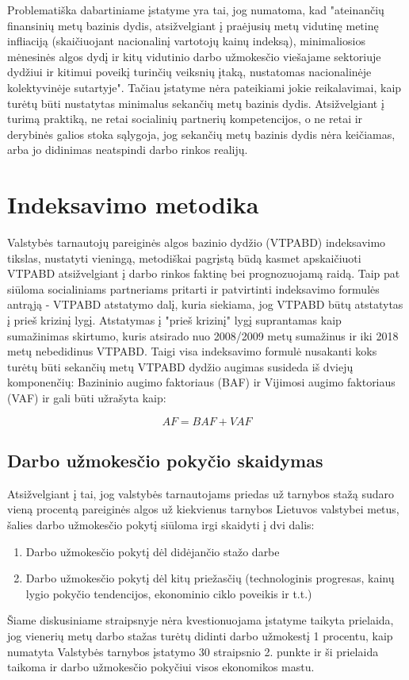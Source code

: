\documentclass[titlepage, 11pt]{article}
\begin{document}
Problematiška dabartiniame įstatyme yra tai, jog numatoma, kad "ateinančių finansinių metų bazinis dydis, atsižvelgiant į praėjusių metų vidutinę metinę infliaciją (skaičiuojant nacionalinį vartotojų kainų indeksą), minimaliosios mėnesinės algos dydį ir kitų vidutinio darbo užmokesčio viešajame sektoriuje dydžiui ir kitimui poveikį turinčių veiksnių įtaką, nustatomas nacionalinėje kolektyvinėje sutartyje". Tačiau įstatyme nėra pateikiami jokie reikalavimai, kaip turėtų būti nustatytas minimalus sekančių metų bazinis dydis. Atsižvelgiant į turimą praktiką, ne retai socialinių partnerių kompetencijos, o ne retai ir derybinės galios stoka sąlygoja, jog sekančių metų bazinis dydis nėra keičiamas, arba jo didinimas neatspindi darbo rinkos realijų.


\section{Indeksavimo metodika}
Valstybės tarnautojų pareiginės algos bazinio dydžio (VTPABD) indeksavimo tikslas, nustatyti vieningą, metodiškai pagrįstą būdą kasmet apskaičiuoti VTPABD atsižvelgiant į darbo rinkos faktinę bei prognozuojamą raidą.
Taip pat siūloma socialiniams partneriams pritarti ir patvirtinti  indeksavimo formulės antrąją - VTPABD atstatymo dalį, kuria siekiama, jog VTPABD būtų atstatytas į prieš krizinį lygį. Atstatymas į "prieš krizinį" lygį suprantamas kaip sumažinimas skirtumo, kuris atsirado nuo 2008/2009 metų sumažinus ir iki 2018 metų nebedidinus VTPABD. 
Taigi visa indeksavimo formulė nusakanti koks turėtų būti sekančių metų VTPABD dydžio augimas susideda iš dviejų komponenčių: Bazininio augimo faktoriaus (BAF) ir Vijimosi augimo faktoriaus (VAF) ir gali būti užrašyta kaip:

\begin{equation}
AF=BAF+VAF
\end{equation}

\subsection{Darbo užmokesčio pokyčio skaidymas}
Atsižvelgiant į tai, jog valstybės tarnautojams priedas už tarnybos stažą sudaro vieną procentą pareiginės algos už kiekvienus tarnybos Lietuvos valstybei metus, šalies darbo užmokesčio pokytį siūloma irgi skaidyti į dvi dalis:
\begin{enumerate}
\item Darbo užmokesčio pokytį dėl didėjančio stažo darbe
\item Darbo užmokesčio pokytį dėl kitų priežasčių (technologinis progresas, kainų lygio pokyčio tendencijos, ekonominio ciklo poveikis ir t.t.)
\end{enumerate}
Šiame diskusiniame straipsnyje nėra kvestionuojama įstatyme taikyta prielaida, jog vienerių metų darbo stažas turėtų didinti darbo užmokestį 1 procentu, kaip numatyta Valstybės tarnybos įstatymo 30 straipsnio 2. punkte ir ši prielaida taikoma ir darbo užmokesčio pokyčiui visos ekonomikos mastu.
\end{document}
